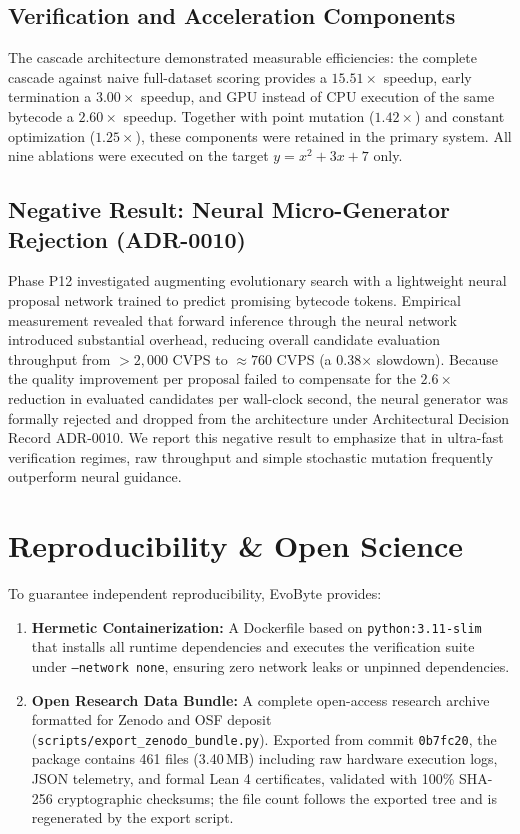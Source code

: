 \documentclass[11pt,a4paper]{article}
\begin{document}
\subsection{Verification and Acceleration Components}
The cascade architecture demonstrated measurable efficiencies: the complete cascade against naive
full-dataset scoring provides a $15.51\times$ speedup, early termination a $3.00\times$ speedup,
and GPU instead of CPU execution of the same bytecode a $2.60\times$ speedup. Together with point
mutation ($1.42\times$) and constant optimization ($1.25\times$), these components were retained
in the primary system. All nine ablations were executed on the target $y = x^2+3x+7$ only.

\subsection{Negative Result: Neural Micro-Generator Rejection (ADR-0010)}
Phase P12 investigated augmenting evolutionary search with a lightweight neural proposal network trained to predict promising bytecode tokens. Empirical measurement revealed that forward inference through the neural network introduced substantial overhead, reducing overall candidate evaluation throughput from $>2,000$ CVPS to $\approx 760$ CVPS (a 0.38$\times$ slowdown). Because the quality improvement per proposal failed to compensate for the $2.6\times$ reduction in evaluated candidates per wall-clock second, the neural generator was formally rejected and dropped from the architecture under Architectural Decision Record ADR-0010. We report this negative result to emphasize that in ultra-fast verification regimes, raw throughput and simple stochastic mutation frequently outperform neural guidance.

\section{Reproducibility \& Open Science}
To guarantee independent reproducibility, EvoByte provides:
\begin{enumerate}
    \item \textbf{Hermetic Containerization:} A Dockerfile based on \texttt{python:3.11-slim} that installs all runtime dependencies and executes the verification suite under \texttt{--network none}, ensuring zero network leaks or unpinned dependencies.
    \item \textbf{Open Research Data Bundle:} A complete open-access research archive formatted for Zenodo and OSF deposit (\texttt{scripts/export\_zenodo\_bundle.py}). Exported from commit \texttt{0b7fc20}, the package contains 461 files (3.40\,MB) including raw hardware execution logs, JSON telemetry, and formal Lean 4 certificates, validated with 100\% SHA-256 cryptographic checksums; the file count follows the exported tree and is regenerated by the export script.
\end{enumerate}
\end{document}
